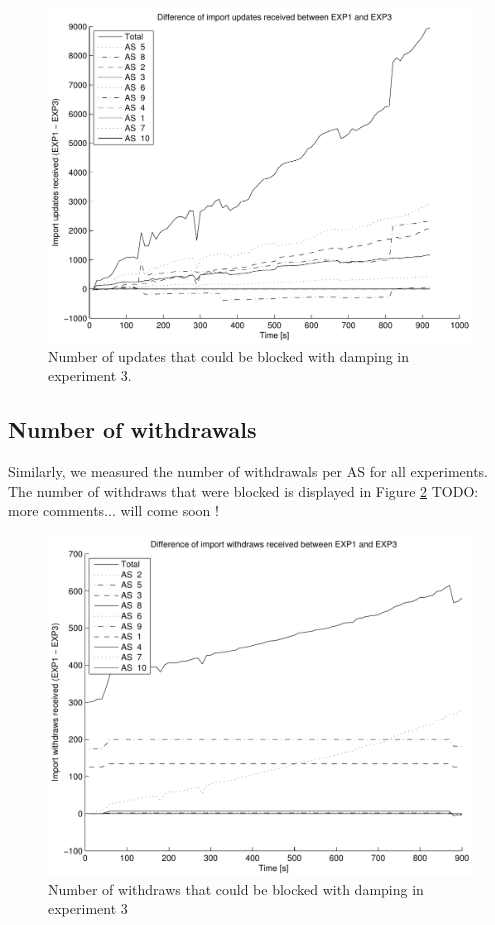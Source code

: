 \documentclass[a4paper,english]{IEEEtran}
\begin{document}
\begin{figure}
\begin{center}
\includegraphics[scale=.5]{img/diff_exp1_exp3_updates.pdf}
\end{center}
\caption{Number of updates that could be blocked with damping in experiment 3.}
\label{fig_diff_updates}
\end{figure}

\subsection{Number of withdrawals}

Similarly, we measured the number of withdrawals per AS for all experiments. 
The number of withdraws that were blocked is displayed in Figure \ref{fig_diff_withdraws}
TODO: more comments... will come soon !

\begin{figure}
\begin{center}
\includegraphics[scale=.5]{img/diff_exp1_exp3_withdraws.pdf}
\end{center}
\caption{Number of withdraws that could be blocked with damping in experiment 3}
\label{fig_diff_withdraws}
\end{figure}
\end{document}

